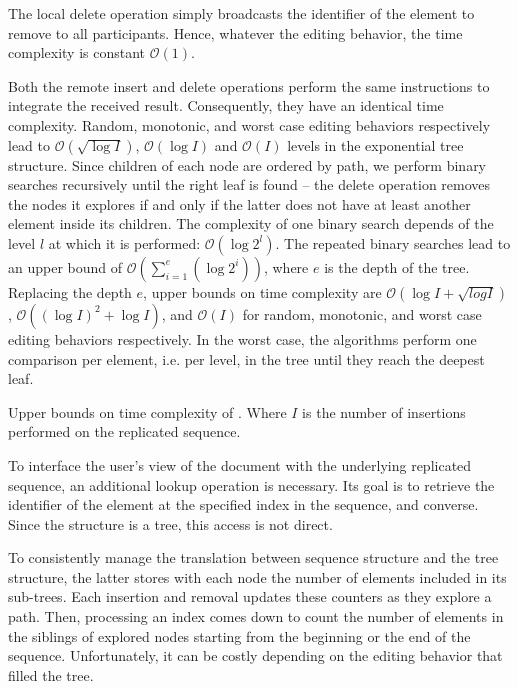 The local delete operation simply broadcasts the identifier of the element to
remove to all participants. Hence, whatever the editing behavior, the time
complexity is constant $\mathcal{O}(1)$.

Both the remote insert and delete operations perform the same instructions to
integrate the received result. Consequently, they have an identical time
complexity. Random, monotonic, and worst case editing behaviors respectively
lead to $\mathcal{O}(\sqrt{\log I})$, $\mathcal{O}(\log I)$ and $\mathcal{O}(I)$
levels in the exponential tree structure. Since children of each node are
ordered by path, we perform binary searches recursively until the right leaf is
found -- the delete operation removes the nodes it explores if and only if the
latter does not have at least another element inside its children. The
complexity of one binary search depends of the level $l$ at which it is
performed: $\mathcal{O}(\log 2^l)$. The repeated binary searches lead to an
upper bound of $\mathcal{O}(\textstyle\sum\nolimits_{i=1}^{e}(\log 2^i))$, where
$e$ is the depth of the tree. Replacing the depth $e$, upper bounds on time
complexity are $\mathcal{O}(\log I + \sqrt{log I})$,
$\mathcal{O}((\log I)^2+\log I)$, and $\mathcal{O}(I)$ for random, monotonic,
and worst case editing behaviors respectively. In the worst case, the algorithms
perform one comparison per element, i.e. per level, in the tree until they reach
the deepest leaf.


\begin{table}
  \caption{\label{table:lseqtime}
    Upper bounds on time complexity of \LSEQ. Where $I$ is the number of 
    insertions performed on the replicated sequence.}
  \centering
  
\end{table}

To interface the user's view of the document with the underlying replicated
sequence, an additional lookup operation is necessary. Its goal is to retrieve
the identifier of the element at the specified index in the sequence, and
converse. Since the structure is a tree, this access is not direct.

To consistently manage the translation between sequence structure and the tree
structure, the latter stores with each node the number of elements included in
its sub-trees. Each insertion and removal updates these counters as they explore
a path. Then, processing an index comes down to count the number of elements in
the siblings of explored nodes starting from the beginning or the end of the
sequence. Unfortunately, it can be costly depending on the editing behavior that
filled the tree.

